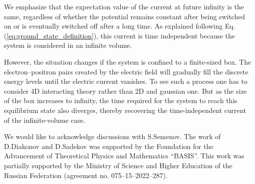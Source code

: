 \documentclass[12pt]{article}
\numberwithin{equation}{section}
\begin{document}
We emphasize that the expectation value of the current at future infinity is the same, regardless of whether the potential remains constant after being switched on or is eventually switched off after a long time. As explained following Eq. (\ref{eq:ground_state_definition}), this current is time independent because the system is considered in an infinite volume.

However, the situation changes if the system is confined to a finite-sized box. The electron–positron pairs created by the electric field will gradually fill the discrete energy levels until the electric current vanishes. To see such a process one has to consider 4D interacting theory rather than 2D and gaussian one. But as the size of the box increases to infinity, the time required for the system to reach this equilibrium state also diverges, thereby recovering the time-independent current of the infinite-volume case.

We would like to acknowledge discussions with S.Semenov. The work of D.Diakonov and D.Sadekov was supported by the Foundation for the Advancement of Theoretical Physics and Mathematics ``BASIS''. This work was partially supported by the Ministry of Science and Higher Education of the Russian Federation (agreement no. 075–15–2022–287).
\end{document}
